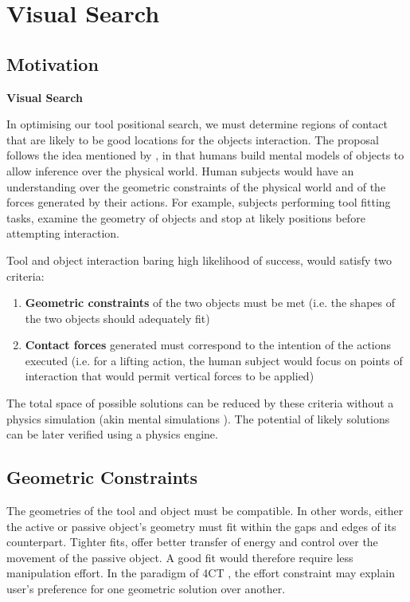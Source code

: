 \documentclass[
    floatsintext
]{article}
\let \shorttitle \textbf
\begin{document}
\section{Visual Search}

\subsection{Motivation}
\shorttitle{Visual Search}

In optimising our tool positional search, we must determine regions of contact that are likely to be good locations for the objects interaction.
The proposal follows the idea mentioned by \cite{battaglia2013}, in that humans build mental models of objects to allow inference over the physical world.
Human subjects would have an understanding over the geometric constraints of the physical world and of the forces generated by their actions.
For example, subjects performing tool fitting tasks, examine the geometry of objects and stop at likely positions before attempting interaction.  

Tool and object interaction baring high likelihood of success, would satisfy two criteria: 
\begin{enumerate}
\item \textbf{Geometric constraints} of the two objects must be met (i.e. the shapes of the two objects should adequately fit)
\item \textbf{Contact forces} generated must correspond to the intention of the actions executed 
  (i.e. for a lifting action, the human subject would focus on points of interaction that would permit vertical forces to be applied)
\end{enumerate}

The total space of possible solutions can be reduced by these criteria without a physics simulation (akin mental simulations \cite{osiurak2014}).
The potential of likely solutions can be later verified using a physics engine. 

\subsection{Geometric Constraints}
The geometries of the tool and object must be compatible. In other words, either the active or passive object's geometry must fit within the gaps and edges of its counterpart.
Tighter fits, offer better transfer of energy and control over the movement of the passive object. A good fit would therefore require less manipulation effort.
In the paradigm of 4CT \cite{osiurak2014}, the effort constraint may explain user's preference for one geometric solution over another.
\end{document}
